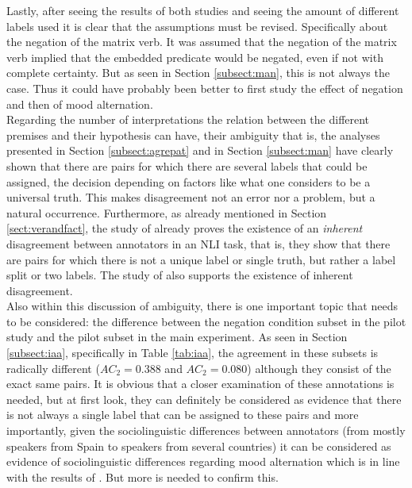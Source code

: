 Lastly, after seeing the results of both studies and seeing the amount of different labels used it is clear that the assumptions must be revised. Specifically about the negation of the matrix verb. It was assumed that the negation of the matrix verb implied that the embedded predicate would be negated, even if not with complete certainty. But as seen in Section \ref{subsect:man}, this is not always the case. Thus it could have probably been better to first study the effect of negation and then of mood alternation.\\

Regarding the number of interpretations the relation between the different premises and their hypothesis can have, their ambiguity that is, the analyses presented in Section \ref{subsect:agrepat} and in Section \ref{subsect:man} have clearly shown that there are pairs for which there are several labels that could be assigned, the decision depending on factors like what one considers to be a universal truth. This makes disagreement not an error nor a problem, but a natural occurrence. Furthermore, as already mentioned in Section \ref{sect:verandfact}, the study of \citet{pavlick2019inherent} already proves the existence of an \textit{inherent} disagreement between annotators in an NLI task, that is, they show that there are pairs for which there is not a unique label or single truth, but rather a label split or two labels. The study of \citet{nie2020can} also supports the existence of inherent disagreement.\\

Also within this discussion of ambiguity, there is one important topic that needs to be considered: the difference between the negation condition subset in the pilot study and the pilot subset in the main experiment. As seen in Section \ref{subsect:iaa}, specifically in Table \ref{tab:iaa}, the agreement in these subsets is radically different ($AC_2=0.388$ and $AC_2=0.080$) although they consist of the exact same pairs. It is obvious that a closer examination of these annotations is needed, but at first look, they can definitely be considered as evidence that there is not always a single label that can be assigned to these pairs and more importantly, given the sociolinguistic differences between annotators (from mostly speakers from Spain to speakers from several countries) it can be considered as evidence of sociolinguistic differences regarding mood alternation which is in line with the results of \citet{faulkner2021systematic}. But more is needed to confirm this.\\

